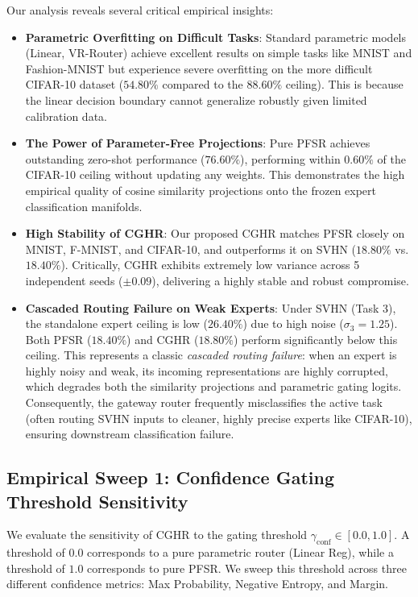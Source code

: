 Our analysis reveals several critical empirical insights:
\begin{itemize}
    \item \textbf{Parametric Overfitting on Difficult Tasks}: Standard parametric models (Linear, VR-Router) achieve excellent results on simple tasks like MNIST and Fashion-MNIST but experience severe overfitting on the more difficult CIFAR-10 dataset ($54.80\%$ compared to the $88.60\%$ ceiling). This is because the linear decision boundary cannot generalize robustly given limited calibration data.
    \item \textbf{The Power of Parameter-Free Projections}: Pure PFSR achieves outstanding zero-shot performance ($76.60\%$), performing within $0.60\%$ of the CIFAR-10 ceiling without updating any weights. This demonstrates the high empirical quality of cosine similarity projections onto the frozen expert classification manifolds.
    \item \textbf{High Stability of CGHR}: Our proposed CGHR matches PFSR closely on MNIST, F-MNIST, and CIFAR-10, and outperforms it on SVHN ($18.80\%$ vs. $18.40\%$). Critically, CGHR exhibits extremely low variance across 5 independent seeds ($\pm 0.09$), delivering a highly stable and robust compromise.
    \item \textbf{Cascaded Routing Failure on Weak Experts}: Under SVHN (Task 3), the standalone expert ceiling is low ($26.40\%$) due to high noise ($\sigma_3 = 1.25$). Both PFSR ($18.40\%$) and CGHR ($18.80\%$) perform significantly below this ceiling. This represents a classic \emph{cascaded routing failure}: when an expert is highly noisy and weak, its incoming representations are highly corrupted, which degrades both the similarity projections and parametric gating logits. Consequently, the gateway router frequently misclassifies the active task (often routing SVHN inputs to cleaner, highly precise experts like CIFAR-10), ensuring downstream classification failure.
\end{itemize}

\subsection{Empirical Sweep 1: Confidence Gating Threshold Sensitivity}
We evaluate the sensitivity of CGHR to the gating threshold $\gamma_{\text{conf}} \in [0.0, 1.0]$. A threshold of $0.0$ corresponds to a pure parametric router (Linear Reg), while a threshold of $1.0$ corresponds to pure PFSR. We sweep this threshold across three different confidence metrics: Max Probability, Negative Entropy, and Margin.

